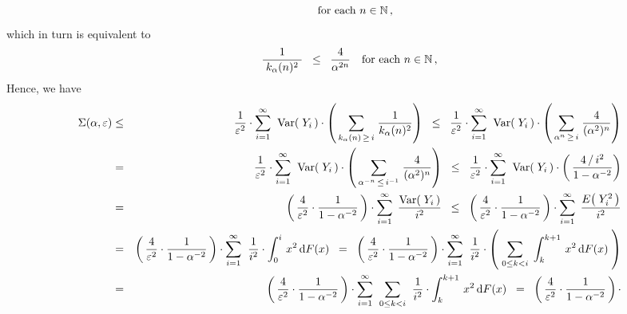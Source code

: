 \begin{enumerate}
\begin{equation*}
\quad
\textnormal{for each $n \in \mathbb{N}$}\,,
\end{equation*}
which in turn is equivalent to
\begin{equation*}
\dfrac{1}{{\color{white}.}k_{\alpha}(n)^{2}{\color{white}.}} \;\;\leq\;\; \dfrac{4}{\alpha^{2n}}
\quad
\textnormal{for each $n \in \N$}\,,
\end{equation*}
Hence, we have
\begin{eqnarray*}
\Sigma(\alpha,\varepsilon)
& \leq &
	\dfrac{1}{\varepsilon^{2}} \cdot
	\overset{\infty}{\underset{i=1}{\sum}}\;\;
	\Var\!\left(\;Y_{i}\,\right)
		\cdot
		\left(\,
			\underset{k_{\alpha}(n)\,\geq\,i}{\sum}\;
			\dfrac{1}{k_{\alpha}(n)^{2}}
			\right)
	\;\; \leq \;\;
	\dfrac{1}{\varepsilon^{2}} \cdot
	\overset{\infty}{\underset{i=1}{\sum}}\;\;
	\Var\!\left(\;Y_{i}\,\right)
		\cdot
		\left(\,
			\underset{\alpha^{n}\,\geq\,i}{\sum}\;
			\dfrac{4}{(\alpha^{2})^{n}}
			\right)
\\
& = &
	\dfrac{1}{\varepsilon^{2}} \cdot
	\overset{\infty}{\underset{i=1}{\sum}}\;\;
	\Var\!\left(\;Y_{i}\,\right)
		\cdot
		\left(\,
			\underset{\alpha^{-n}\,\leq\,i^{-1}}{\sum}\;
			\dfrac{4}{(\alpha^{2})^{n}}
			\right)
	\;\; \leq \;\;
	\dfrac{1}{\varepsilon^{2}} \cdot
	\overset{\infty}{\underset{i=1}{\sum}}\;\;
	\Var\!\left(\;Y_{i}\,\right)
		\cdot
		\left(\,
			\dfrac{4\,/\,i^{2}}{1-\alpha^{-2}}
			\right)
\\
& = &
	\left(\,\dfrac{4}{\varepsilon^{2}} \cdot \dfrac{1}{1-\alpha^{-2}}\,\right) \cdot
	\overset{\infty}{\underset{i=1}{\sum}}\;\,
	\dfrac{\Var\!\left(\;Y_{i}\,\right)}{i^{2}}
	\;\; \leq \;\;
	\left(\,\dfrac{4}{\varepsilon^{2}} \cdot \dfrac{1}{1-\alpha^{-2}}\,\right) \cdot
	\overset{\infty}{\underset{i=1}{\sum}}\;\,
	\dfrac{E\!\left(\;Y_{i}^{2}\,\right)}{i^{2}}
\\
& = &
	\left(\,\dfrac{4}{\varepsilon^{2}} \cdot \dfrac{1}{1-\alpha^{-2}}\,\right) \cdot
	\overset{\infty}{\underset{i=1}{\sum}}\;\;
	\dfrac{1}{i^{2}} \cdot \int_{0}^{i}\, x^{2} \,\d F(x)
	\;\; = \;\;
	\left(\,\dfrac{4}{\varepsilon^{2}} \cdot \dfrac{1}{1-\alpha^{-2}}\,\right) \cdot
	\overset{\infty}{\underset{i=1}{\sum}}\;\;
	\dfrac{1}{i^{2}} \cdot 
	\left(\;
		\underset{0 \leq k < i}{\sum}\;\int_{k}^{k+1}\, x^{2} \,\d F(x)
		\;\right)
\\
& = &
	\left(\,\dfrac{4}{\varepsilon^{2}} \cdot \dfrac{1}{1-\alpha^{-2}}\,\right) \cdot
	\overset{\infty}{\underset{i=1}{\sum}}\;\;
	\underset{0 \leq k < i}{\sum}\;\;
	\dfrac{1}{i^{2}} \cdot  \int_{k}^{k+1}\, x^{2} \,\d F(x)
	\;\; = \;\;
	\left(\,\dfrac{4}{\varepsilon^{2}} \cdot \dfrac{1}{1-\alpha^{-2}}\,\right) \cdot

\end{eqnarray*}
\end{enumerate}
